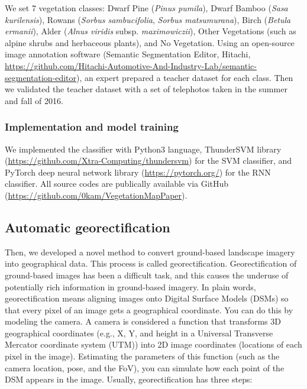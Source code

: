 \documentclass{article}
\begin{document}
We set 7 vegetation classes: Dwarf Pine (\emph{Pinus pumila}), Dwarf Bamboo (\emph{Sasa kurilensis}), Rowans (\emph{Sorbus sambucifolia}, \emph{Sorbus matsumurana}), Birch (\emph{Betula ermanii}), Alder (\emph{Alnus viridis} subsp. \emph{maximowiczii}), Other Vegetations (such as alpine shrubs and herbaceous plants), and No Vegetation. Using an open-source image annotation software (Semantic Segmentation Editor, Hitachi, \url{https://github.com/Hitachi-Automotive-And-Industry-Lab/semantic-segmentation-editor}), an expert prepared a teacher dataset for each class. Then we validated the teacher dataset with a set of telephotos taken in the summer and fall of 2016.

\hypertarget{implementation-and-model-training}{%
\subsubsection{Implementation and model training}\label{implementation-and-model-training}}

We implemented the classifier with Python3 language, ThunderSVM library (\url{https://github.com/Xtra-Computing/thundersvm}) for the SVM classifier, and PyTorch deep neural network library (\url{https://pytorch.org/}) for the RNN classifier. All source codes are publically available via GitHub (\url{https://github.com/0kam/VegetationMapPaper}).

\hypertarget{automatic-georectification}{%
\subsection{Automatic georectification}\label{automatic-georectification}}

Then, we developed a novel method to convert ground-based landscape imagery into geographical data. This process is called georectification. Georectification of ground-based images has been a difficult task, and this causes the underuse of potentially rich information in ground-based imagery. In plain words, georectification means aligning images onto Digital Surface Models (DSMs) so that every pixel of an image gets a geographical coordinate. You can do this by modeling the camera. A camera is considered a function that transforms 3D geographical coordinates (e.g., X, Y, and height in a Universal Transverse Mercator coordinate system (UTM)) into 2D image coordinates (locations of each pixel in the image). Estimating the parameters of this function (such as the camera location, pose, and the FoV), you can simulate how each point of the DSM appears in the image. Usually, georectification has three steps:
\end{document}
